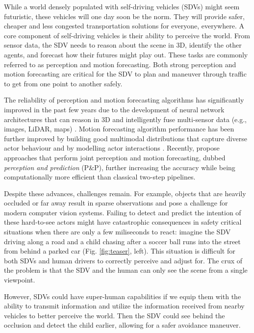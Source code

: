 \documentclass[runningheads]{llncs}
\newcommand{\pnp}{P\&P}
\begin{document}
While a world densely populated with self-driving vehicles (SDVs) might seem futuristic, these vehicles will one day soon be the norm.
They will provide safer, cheaper and less congested transportation solutions for everyone, everywhere. 
A core component
of self-driving vehicles is their ability to perceive the world. 
From sensor data, 
the SDV 
needs to reason about the scene in 3D, identify the other agents, 
and forecast how their futures might play out.
These tasks are commonly referred to as perception and motion forecasting.
Both strong perception and motion forecasting  are critical for the SDV to plan and maneuver through traffic to get from one point to another safely.

The reliability of perception and 
motion forecasting
algorithms has significantly improved in the past few years due to the development of neural network architectures that can reason in 3D and intelligently fuse multi-sensor data (e.g., images, LiDAR, maps)  \cite{liang2018deep, liang2019multi}.
Motion forecasting algorithm performance has been further improved by 
building good multimodal distributions  \cite{jain2019discrete, chai2019multipath, cui2019deep,ilvm} that capture diverse actor behaviour
and by modelling actor interactions \cite{casas2019spatially, rhinehart2018r2p2, rhinehart2019precog,li2020end}.
Recently, 
\cite{luo2018fast, casas2018intentnet} propose 
approaches that perform joint perception and 
motion forecasting, dubbed \textit{perception and prediction} (\pnp),
further increasing the accuracy while being computationally more efficient than classical two-step pipelines.

Despite these advances,  
challenges 
remain.
For example, objects that are heavily occluded or far away
result in 
sparse observations and pose a challenge for modern computer vision systems.
Failing to detect and predict the intention of these hard-to-see actors might have catastrophic consequences in safety critical situations when there are only a few miliseconds to react: 
imagine the SDV driving along a road and a 
child chasing after a soccer ball runs into the street from behind a parked car (Fig. \ref{fig:teaser}, left). 
This situation is 
difficult for both SDVs 
and
human drivers to correctly perceive and adjust for. 
The crux of the problem is that 
the SDV and the human can only see the scene from a single viewpoint. 

However,  SDVs 
could
have super-human capabilities if we equip them with the ability to transmit information and utilize the information received from nearby vehicles to better perceive the world.   
Then the SDV could
see behind the 
occlusion and detect the 
child 
earlier, allowing for a safer 
avoidance maneuver. 
\end{document}
